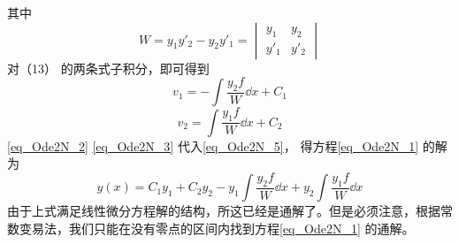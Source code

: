 其中
\begin{equation}
W = y_1 y'_2 - y_2 y'_1 = 
\begin{vmatrix}
y_1 & y_2\\
y'_1 & y'_2
\end{vmatrix}
\end{equation}
对（13）%
的两条式子积分，即可得到
\begin{equation}\label{eq_Ode2N_2}
v_1 =  - \int \frac{y_2 f}{W} \dd{x}  + C_1
\end{equation}
\begin{equation}\label{eq_Ode2N_3}
v_2 = \int \frac{y_1 f}{W} \dd{x}  + C_2
\end{equation}
\autoref{eq_Ode2N_2} \autoref{eq_Ode2N_3} 代入\autoref{eq_Ode2N_5}， 得方程\autoref{eq_Ode2N_1} 的解为
\begin{equation}
y(x) = C_1 y_1 + C_2 y_2 - y_1 \int \frac{y_2 f}{W} \dd{x} + y_2 \int \frac{y_1 f}{W} \dd{x}
\end{equation}
由于上式满足线性微分方程解的结构，所这已经是通解了。但是必须注意，根据常数变易法，我们只能在没有零点的区间内找到方程\autoref{eq_Ode2N_1} 的通解。
